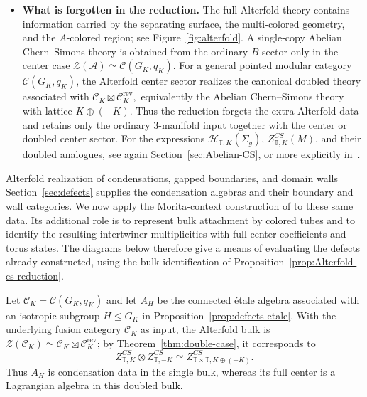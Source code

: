 \documentclass[12pt]{amsart}
\makeatletter
\renewcommand\subsection{\@startsection{subsection}{2}%
  \z@{.5\linespacing\@plus.7\linespacing}{-.5em}%
  {\normalfont\bfseries}}
\numberwithin{equation}{section}
\theoremstyle{definition}
\makeatother
\begin{document}
\begin{itemize}
\item
\textbf{What is forgotten in the reduction.}
The full Alterfold theory contains information carried by the separating surface, the multi-colored geometry, and the $A$-colored region; see Figure~\ref{fig:alterfold}. A single-copy Abelian Chern--Simons theory is obtained from the ordinary $B$-sector only in the center case $\mathcal Z(\mathcal A)\simeq \mathcal C(G_K,q_K)$. For a general pointed modular category $\mathcal C(G_K,q_K)$, the Alterfold center sector realizes the canonical doubled theory associated with $\mathcal C_K\boxtimes \mathcal C_K^{\mathrm{rev}},$ equivalently the Abelian Chern--Simons theory with lattice $K\oplus(-K)$. Thus the reduction forgets the extra Alterfold data and retains only the ordinary $3$-manifold input together with the center or doubled center sector. For the expressions $\mathcal H_{\mathbb T,K}(\Sigma_g)$, $Z^{CS}_{\mathbb T,K}(M)$, and their doubled analogues, see again Section~\ref{sec:Abelian-CS}, or more explicitly in~\cite{Galviz2}.
\end{itemize}

\subsection{Alterfold realization of condensations, gapped boundaries, and domain walls}
Section~\ref{sec:defects} supplies the condensation algebras and their
boundary and wall categories. We now apply the Morita-context construction
of \cite{Alterfold1,Alterfold2} to these same data. Its additional role is
to represent bulk attachment by colored tubes and to identify the resulting
intertwiner multiplicities with full-center coefficients and torus states.
The diagrams below therefore give a means of evaluating the defects already
constructed, using the bulk identification of
Proposition~\ref{prop:Alterfold-cs-reduction}.

Let $\mathcal C_K=\mathcal C(G_K,q_K)$ and let $A_H$ be the connected
\'etale algebra associated with an isotropic subgroup $H\le G_K$ in
Proposition~\ref{prop:defects-etale}. With the underlying fusion category
$\mathcal C_K$ as input, the Alterfold bulk is
$\mathcal Z(\mathcal C_K)\simeq
\mathcal C_K\boxtimes\mathcal C_K^{\mathrm{rev}}$; by
Theorem~\ref{thm:double-case}, it corresponds to
$$
Z^{CS}_{\mathbb T,K}\otimes Z^{CS}_{\mathbb T,-K}
\simeq Z^{CS}_{\mathbb T\times\mathbb T,K\oplus(-K)}.
$$
Thus $A_H$ is condensation data in the single bulk, whereas its full
center is a Lagrangian algebra in this doubled bulk.
\end{document}
